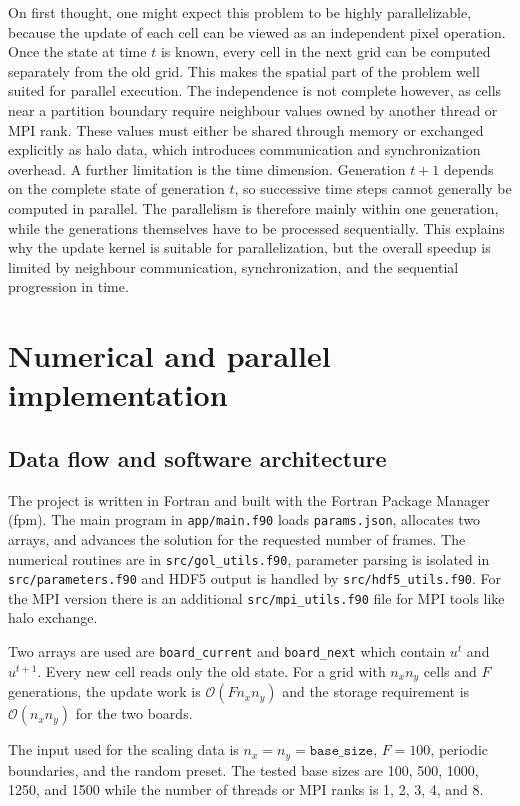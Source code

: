 \documentclass[11pt,a4paper]{article}
\begin{document}
On first thought, one might expect this problem to be highly parallelizable,
because the update of each cell can be viewed as an independent pixel
operation. Once the state at time $t$ is known, every cell in the next grid
can be computed separately from the old grid. This makes the spatial part of
the problem well suited for parallel execution. The independence is not
complete however, as cells near a partition boundary require neighbour values
owned by another thread or MPI rank. These values must either be shared
through memory or exchanged explicitly as halo data, which introduces
communication and synchronization overhead. A further limitation is the time
dimension. Generation $t+1$ depends on the complete state of generation $t$,
so successive time steps cannot generally be computed in parallel. The
parallelism is therefore mainly within one generation, while the generations
themselves have to be processed sequentially. This explains why the update
kernel is suitable for parallelization, but the overall speedup is limited by
neighbour communication, synchronization, and the sequential progression in
time.

\section{Numerical and parallel implementation}

\subsection{Data flow and software architecture}
The project is written in Fortran and built with the Fortran Package
Manager (fpm). The main program in \texttt{app/main.f90} loads \texttt{params.json},
allocates two arrays, and advances the solution for the requested number of
frames. The numerical routines are in \texttt{src/gol\_utils.f90},
parameter parsing is isolated in \texttt{src/parameters.f90} and HDF5 output is handled
by \texttt{src/hdf5\_utils.f90}. For the MPI version there is an additional 
\texttt{src/mpi\_utils.f90} file for MPI tools like halo exchange.

Two arrays are used are \texttt{board\_current} and \texttt{board\_next} which 
contain $u^t$ and $u^{t+1}$. Every new cell reads only the old state. For a 
grid with $n_x n_y$ cells and $F$ generations, the update work is $\mathcal{O}(F n_x n_y)$ 
and the storage requirement is $\mathcal{O}(n_x n_y)$ for the two boards.

The input used for the scaling data is $n_x=n_y=\texttt{base\_size}$,
$F=100$, periodic boundaries, and the random preset. The tested base sizes are
100, 500, 1000, 1250, and 1500 while the number of threads or MPI ranks is 1, 2, 3, 4, and 8.
\end{document}
